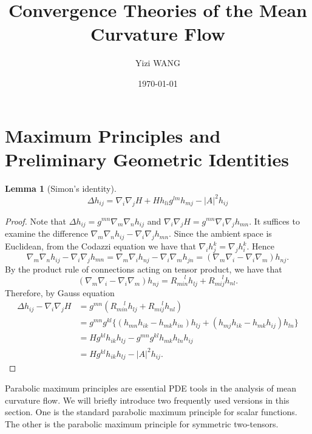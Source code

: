 \documentclass[a4paper]{report}
\title{Convergence Theories of the Mean Curvature Flow}
\author{Yizi WANG}
\date{\today}
\newtheorem{lemma}{Lemma}
\theoremstyle{remark}
\begin{document}
\maketitle

\section{Maximum Principles and Preliminary Geometric Identities}

\begin{lemma}
	[Simon's identity]
	\[\Delta h_{ij}^{} = \nabla_{i}\nabla_{j} H + H h_{li}^{} g_{}^{lm } h_{mj}^{} - \left| A \right| ^2 h_{ij}^{} \]
\end{lemma}

\begin{proof}
	Note that $\Delta h_{ij}^{} = g_{}^{mn} \nabla_{m}\nabla_{n} h_{ij}^{} $ and $\nabla_{i}\nabla_{j} H = g_{}^{mn } \nabla_{i}\nabla_{j} h_{mn }^{} $. It suffices to examine the difference $\nabla_{m}\nabla_{n} h_{ij}^{} - \nabla_{i}\nabla_{j} h_{mn}^{} .$ Since the ambient space is Euclidean, from the Codazzi equation we have that $\nabla_{i}^{} h_{j}^{k} = \nabla_{j}^{} h_{i}^{k}$. Hence \[\nabla_{m}\nabla_{n} h_{ij}^{} - \nabla_{i}\nabla_{j} h_{mn}^{} = \nabla_{m}\nabla_{i} h_{nj}^{} - \nabla_{i}\nabla_{m} h_{jn}^{}=(\nabla_{m}\nabla_{i}  - \nabla_{i}\nabla_{m})h_{nj}^{}.\] By the product rule of connections acting on tensor product, we have that \[(\nabla_{m}\nabla_{i}  - \nabla_{i}\nabla_{m})h_{nj}^{} = R_{min}^{\quad\  l} h_{lj}^{} + R_{mij}^{\quad \ l} h_{nl }^{}.  \]
	Therefore, by Gauss equation
	\begin{equation*}
		\begin{split}
			\Delta h_{ij}^{} - \nabla_{i}\nabla_{j} H
			&= g_{}^{mn} (R_{min }^{\quad \ l} h_{lj}^{} + R_{mij}^{\quad \ l} h_{nl }^{} ) \\
			&= g_{}^{mn } g_{}^{kl} \{(h_{mn}^{} h_{ik }^{} -h_{mk }^{} h_{in }^{} )h_{lj}^{} + (h_{mj }^{} h_{ik }^{} - h_{mk }^{} h_{ij}^{} )h_{ln}^{} \}\\
			&= H g_{}^{kl} h_{ik }^{}  h_{lj}^{} - g_{}^{mn } g_{}^{kl } h_{mk }^{} h_{ln }^{} h_{ij}^{} \\
			&= H g_{}^{kl} h_{ik }^{}  h_{lj}^{} - \left| A \right| ^2 h_{ij}^{} .
		\end{split}
	\end{equation*}
\end{proof}

Parabolic maximum principles are essential PDE tools in the analysis of mean curvature flow. We will briefly introduce two frequently used versions in this section. One is the standard parabolic maximum principle for scalar functions. The other is the parabolic maximum principle for symmetric two-tensors.
\end{document}
